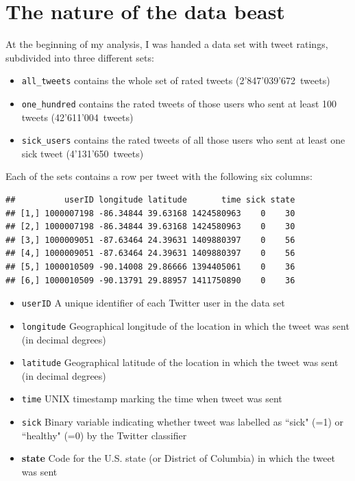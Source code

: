 \documentclass[11pt, a4paper,twoside]{report}\usepackage[]{graphicx}\usepackage[]{color}
\makeatletter
\newenvironment{kframe}{%
 \def\at@end@of@kframe{}%
 \ifinner\ifhmode%
  \def\at@end@of@kframe{\end{minipage}}%
  \begin{minipage}{\columnwidth}%
 \fi\fi%
 \def\FrameCommand##1{\hskip\@totalleftmargin \hskip-\fboxsep
 \colorbox{shadecolor}{##1}\hskip-\fboxsep
     \hskip-\linewidth \hskip-\@totalleftmargin \hskip\columnwidth}%
 \MakeFramed {\advance\hsize-\width
   \@totalleftmargin\z@ \linewidth\hsize
   \@setminipage}}%
 {\par\unskip\endMakeFramed%
 \at@end@of@kframe}
\newenvironment{knitrout}{}{} %
\makeatother
\begin{document}
\section{The nature of the data beast}
\label{sec:starting}

At the beginning of my analysis, I was handed a data set with tweet ratings, subdivided into three different sets: 

\begin{itemize}
  \item \texttt{all\_tweets} contains the whole set of rated tweets (2'847'039'672~tweets)
  \item \texttt{one\_hundred} contains the rated tweets of those users who sent at least 100 tweets (42'611'004~tweets)
  \item \texttt{sick\_users} contains the rated tweets of all those users who sent at least one sick tweet (4'131'650~tweets)
\end{itemize}

Each of the sets contains a row per tweet with the following six columns: 

\begin{knitrout}
\color{fgcolor}\begin{kframe}
\begin{verbatim}
##          userID longitude latitude       time sick state
## [1,] 1000007198 -86.34844 39.63168 1424580963    0    30
## [2,] 1000007198 -86.34844 39.63168 1424580963    0    30
## [3,] 1000009051 -87.63464 24.39631 1409880397    0    56
## [4,] 1000009051 -87.63464 24.39631 1409880397    0    56
## [5,] 1000010509 -90.14008 29.86666 1394405061    0    36
## [6,] 1000010509 -90.13791 29.88957 1411750890    0    36
\end{verbatim}
\end{kframe}
\end{knitrout}

\begin{itemize}
  \item \texttt{userID} A unique identifier of each Twitter user in the data set
  \item \texttt{longitude} Geographical longitude of the location in which the tweet was sent (in decimal degrees)
  \item \texttt{latitude} Geographical latitude  of the location in which the tweet was sent (in decimal degrees)
  \item \texttt{time} UNIX timestamp marking the time when tweet was sent
  \item \texttt{sick} Binary variable indicating whether tweet was labelled as ``sick" (=1) or ``healthy" (=0) by the Twitter classifier
  \item \textbf{state} Code for the U.S. state (or District of Columbia) in which the tweet was sent
\end{itemize}
\end{document}
